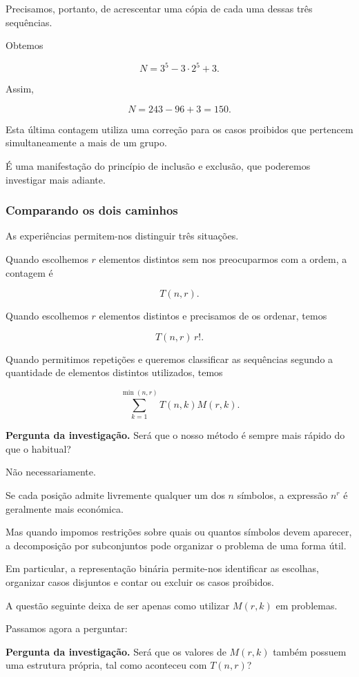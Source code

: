\documentclass[11pt,a4paper,oneside]{book}
\newcommand{\Pergunta}[1]{\begin{perguntabox}\textbf{Pergunta da investigação.} #1\end{perguntabox}}
\begin{document}
Precisamos, portanto, de acrescentar
uma cópia de cada uma dessas três sequências.

Obtemos

\[
N=3^5-3\cdot2^5+3.
\]

Assim,

\[
N=243-96+3=\boxed{150}.
\]

Esta última contagem utiliza uma correção
para os casos proibidos que pertencem
simultaneamente a mais de um grupo.

É uma manifestação do princípio
de inclusão e exclusão, que poderemos
investigar mais adiante.

\subsubsection*{Comparando os dois caminhos}

As experiências permitem-nos distinguir
três situações.

Quando escolhemos $r$ elementos distintos
sem nos preocuparmos com a ordem,
a contagem é

\[
T(n,r).
\]

Quando escolhemos $r$ elementos distintos
e precisamos de os ordenar, temos

\[
T(n,r)\,r!.
\]

Quando permitimos repetições e queremos
classificar as sequências segundo a quantidade
de elementos distintos utilizados, temos

\[
\sum_{k=1}^{\min(n,r)}T(n,k)M(r,k).
\]

\Pergunta{Será que o nosso método é sempre
mais rápido do que o habitual?}

Não necessariamente.

Se cada posição admite livremente
qualquer um dos $n$ símbolos, a expressão
$n^r$ é geralmente mais económica.

Mas quando impomos restrições sobre
quais ou quantos símbolos devem aparecer,
a decomposição por subconjuntos pode
organizar o problema de uma forma útil.

Em particular, a representação binária
permite-nos identificar as escolhas,
organizar casos disjuntos e contar
ou excluir os casos proibidos.

A questão seguinte deixa de ser apenas
como utilizar $M(r,k)$ em problemas.

Passamos agora a perguntar:

\Pergunta{Será que os valores de $M(r,k)$
também possuem uma estrutura própria,
tal como aconteceu com $T(n,r)$?}
\end{document}
